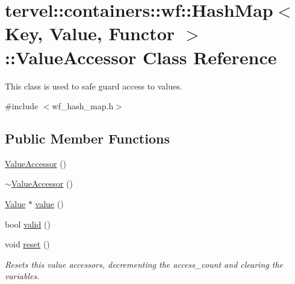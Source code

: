 \hypertarget{classtervel_1_1containers_1_1wf_1_1_hash_map_1_1_value_accessor}{}\section{tervel\+:\+:containers\+:\+:wf\+:\+:Hash\+Map$<$ Key, Value, Functor $>$\+:\+:Value\+Accessor Class Reference}
\label{classtervel_1_1containers_1_1wf_1_1_hash_map_1_1_value_accessor}


This class is used to safe guard access to values.  




{\ttfamily \#include $<$wf\+\_\+hash\+\_\+map.\+h$>$}

\subsection*{Public Member Functions}
\begin{DoxyCompactItemize}
\item 
\hyperlink{classtervel_1_1containers_1_1wf_1_1_hash_map_1_1_value_accessor_a5cf5be9f8fcf0b32ecac2d6ba1d18a24}{Value\+Accessor} ()
\item 
\hyperlink{classtervel_1_1containers_1_1wf_1_1_hash_map_1_1_value_accessor_a4a79d0ccc099187188e7d001406f4381}{$\sim$\+Value\+Accessor} ()
\item 
\hyperlink{hash__map_2test_object_8h_ad777bf08d8e2b01df17ba5e3c51ae11f}{Value} $\ast$ \hyperlink{classtervel_1_1containers_1_1wf_1_1_hash_map_1_1_value_accessor_a54f9f278457daf02a4e140cbe053643b}{value} ()
\item 
bool \hyperlink{classtervel_1_1containers_1_1wf_1_1_hash_map_1_1_value_accessor_adf525344b84c57e6c560b7fe46db7a4f}{valid} ()
\item 
void \hyperlink{classtervel_1_1containers_1_1wf_1_1_hash_map_1_1_value_accessor_ac255a8bda6d5118c2987f91aa4cc0ca7}{reset} ()
\begin{DoxyCompactList}\small\item\em Resets this value accessors, decrementing the access\+\_\+count and clearing the variables. \end{DoxyCompactList}\end{DoxyCompactItemize}
